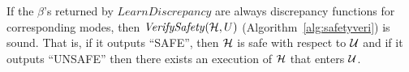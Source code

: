 \begin{theorem}
	If the $\beta$'s returned by $\mathit{LearnDiscrepancy}$ 
	are always  discrepancy functions for corresponding modes, then $\mathit{VerifySafety}({\mathcal H},U)$ (Algorithm~\ref{alg:safetyveri}) is sound. That is, if it outputs ``SAFE'', then ${\mathcal H}$  is safe with respect to ${\mathcal U}$ and if it outputs ``UNSAFE'' then there exists an execution of ${\mathcal H}$ that enters ${\mathcal U}$.
\end{theorem}

